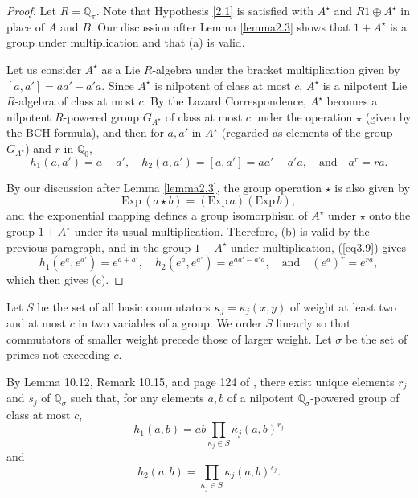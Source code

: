 \documentclass[mathscr]{amsart}
\theoremstyle{theorem}
\theoremstyle{definition}
\numberwithin{equation}{section}
\def \({\left(}
\def \){\right)}
\def \Exp{\text{Exp}\,}
\begin{document}
\begin{proof}
Let $R=\mathbb{Q}_\pi$.  Note that Hypothesis \ref{2.1} is satisfied
with $A^\star$ and $R1\oplus A^\star$ in place of $A$ and $B$. Our
discussion after Lemma \ref{lemma2.3} shows that $1+A^\star$ is a
group under multiplication and that (a) is valid.

Let us consider $A^\star$ as a Lie $R$-algebra under the bracket
multiplication given by $\left[a,a'\right]=aa'-a'a$.  Since
$A^\star$ is nilpotent of class at most $c$, $A^\star$ is a
nilpotent Lie $R$-algebra of class at most $c$.  By the Lazard
Correspondence, $A^\star$ becomes a nilpotent $R$-powered group
$G_{A^\star}$ of class at most $c$ under the operation $\star$
(given by the BCH-formula), and then for $a,a'$ in $A^\star$
(regarded as elements of the group $G_{A^\star}$) and $r$ in
$\mathbb{Q}_0$,
\begin{equation}\label{eq3.9}
h_1\(a,a'\)=a+a',\quad
h_2\(a,a'\)=\left[a,a'\right]=aa'-a'a,\quad\text{and}\quad a^r=ra.
\end{equation}

  By our discussion after Lemma \ref{lemma2.3}, the group operation
  $\star$ is also given by
$$
\Exp\(a\star b\)=\(\Exp a\)\(\Exp b\),
$$
and the exponential mapping defines a group isomorphism of $A^\star$
under $\star$ onto the group $1+A^\star$ under its usual
multiplication. Therefore, (b) is valid by the previous paragraph,
and in the group $1+A^\star$ under multiplication, (\ref{eq3.9})
gives
$$h_1\(e^a,e^{a'}\)=e^{a+a'},\quad h_2\(e^a,e^{a'}\)=e^{aa'-a'a},\quad\text{and}\quad\(e^a\)^r=e^{ra},$$ which then gives (c).
\end{proof}

Let $S$ be the set of all basic commutators
$\kappa_j=\kappa_j\(x,y\)$ of weight at least two and at most $c$ in
two variables of a group.  We order $S$ linearly so that commutators
of smaller weight precede those of larger weight.  Let $\sigma$ be
the set of primes not exceeding $c$.

By Lemma 10.12, Remark 10.15, and page 124 of \cite{Kh}, there exist
unique elements $r_j$ and $s_j$ of $\mathbb{Q}_\sigma$ such that,
for any elements $a,b$ of a nilpotent $\mathbb{Q}_\sigma$-powered
group of class at most $c$,
\begin{equation}\label{eq3.10}
h_1(a,b)=ab\prod_{\kappa_j\in S} \kappa_j\(a,b\)^{r_j}
\end{equation}
and
\begin{equation}\label{eq3.11}
h_2\(a,b\)=\prod_{\kappa_j\in S} \kappa_j\(a,b\)^{s_j}.
\end{equation}
\end{document}
